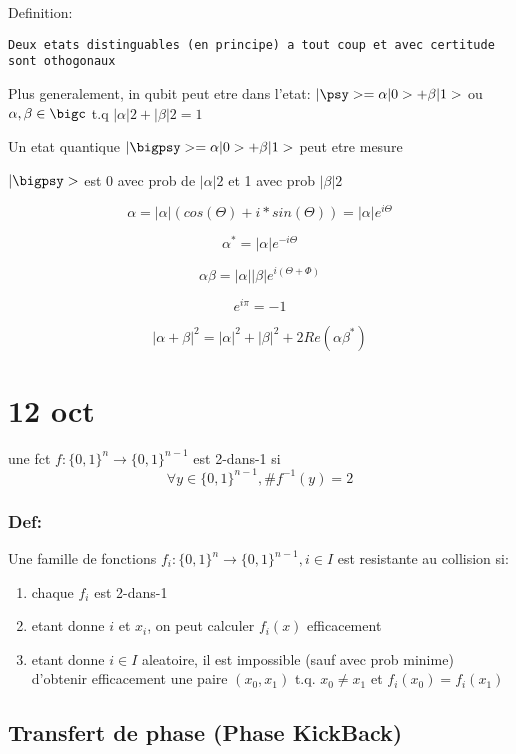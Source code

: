 Definition:

\begin{verbatim}
Deux etats distinguables (en principe) a tout coup et avec certitude sont othogonaux
\end{verbatim}

Plus generalement, in qubit peut etre dans l'etat:
\(|\psy> = \alpha|0> + \beta|1>\) ou \(\alpha,\beta \in \bigc\) t.q
\(|\alpha|2+|\beta|2 = 1\)

Un etat quantique \(|\bigpsy>=\alpha|0> + \beta|1>\) peut etre mesure

\(|\bigpsy>\) est 0 avec prob de \(|\alpha|2\) et 1 avec prob
\(|\beta|2\)

\[
\alpha = |\alpha|(cos(\Theta) + i*sin(\Theta))
=|\alpha|e^{i\Theta}
\]

\[
\alpha^{*} = |\alpha|e^{-i\Theta}
\]

\[
\alpha\beta = |\alpha||\beta|e^{i(\Theta+\Phi)}
\]

\[
e^{i\pi}=-1
\]

\[
|\alpha + \beta|^2 = |\alpha|^2+|\beta|^2 + 2Re(\alpha\beta^*)
\]

\section{12 oct}\label{oct}

une fct \(f: \{0,1\}^n \to \{0,1\}^{n-1}\) est 2-dans-1 si \[
\forall y \in \{0,1\}^{n-1}, \#f^{-1}(y)=2
\]

\subsubsection{Def:}\label{def}

Une famille de fonctions \(f_i:\{0,1\}^n \to \{0,1\}^{n-1}, i \in I\)
est resistante au collision si:

\begin{enumerate}
\tightlist
\item
  chaque \(f_i\) est 2-dans-1
\item
  etant donne \(i\) et \(x_i\), on peut calculer \(f_i(x)\) efficacement
\item
  etant donne \(i \in I\) aleatoire, il est impossible (sauf avec prob
  minime) d'obtenir efficacement une paire \((x_0,x_1)\) t.q.
  \(x_0 \neq x_1\) et \(f_i(x_0)=f_i(x_1)\)
\end{enumerate}

\subsection{Transfert de phase (Phase
KickBack)}\label{transfert-de-phase-phase-kickback}

